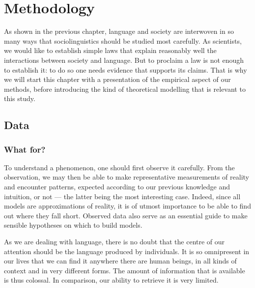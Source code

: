 \documentclass[../thesis.tex]{subfiles}
\begin{document}
\chapter{Methodology}
\label{ch:methods}

As shown in the previous chapter, language and society are interwoven in so many ways
that sociolinguistics should be studied most carefully. As scientists, we would like to
establish simple laws that explain reasonably well the interactions between society and
language. But to proclaim a law is not enough to establish it: to do so one needs
evidence that supports its claims. That is why we will start this chapter with a
presentation of the empirical aspect of our methods, before introducing the kind of
theoretical modelling that is relevant to this study.



\section{Data}
\subsection{What for?}
To understand a phenomenon, one should first observe it carefully. From the observation,
we may then be able to make representative measurements of reality and encounter
patterns, expected according to our previous knowledge and intuition, or not --- the
latter being the most interesting case. Indeed, since all models are approximations of
reality, it is of utmost importance to be able to find out where they fall short.
Observed data also serve as an essential guide to make sensible hypotheses on which to
build models.

As we are dealing with language, there is no doubt that the centre of our attention
should be the language produced by individuals. It is so omnipresent in our lives that
we can find it anywhere there are human beings, in all kinds of context and in very
different forms. The amount of information that is available is thus colossal. In
comparison, our ability to retrieve it is very limited.
\end{document}
